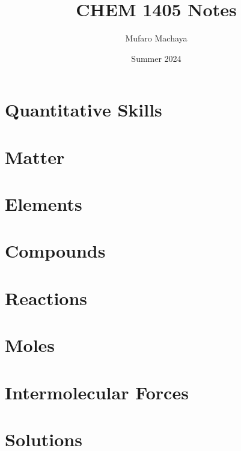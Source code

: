\documentclass[12pt]{report}
\title{CHEM 1405 Notes}
\author{Mufaro Machaya}
\date{Summer 2024}
\begin{document}
\maketitle

\newpage

\tableofcontents

\newpage

\chapter{Quantitative Skills}


\chapter{Matter}


\chapter{Elements}


\chapter{Compounds}


\chapter{Reactions}


\chapter{Moles}


\chapter{Intermolecular Forces}


\chapter{Solutions}

\end{document}
